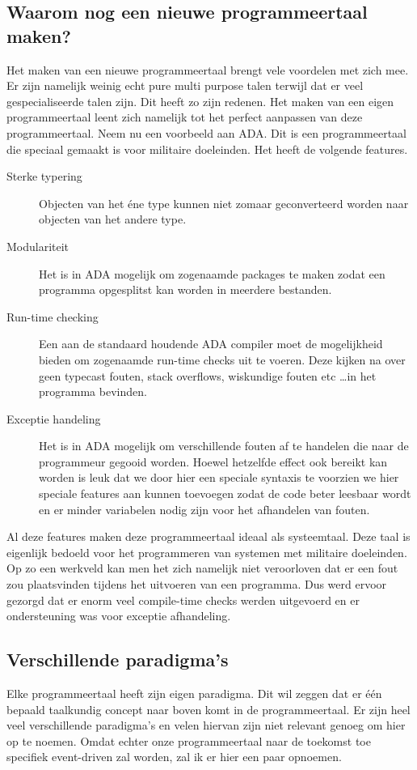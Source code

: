 \documentclass[11pt,a4paper]{article}
\begin{document}
\subsection{Waarom nog een nieuwe programmeertaal maken?}
Het maken van een nieuwe programmeertaal brengt vele voordelen met zich mee. Er zijn namelijk weinig echt pure multi purpose talen terwijl dat er veel gespecialiseerde talen zijn. Dit heeft zo zijn redenen. Het maken van een eigen programmeertaal leent zich namelijk tot het perfect aanpassen van deze programmeertaal. Neem nu een voorbeeld aan ADA. Dit is een programmeertaal die speciaal gemaakt is voor militaire doeleinden. Het heeft de volgende features.

\begin{description}
\item[Sterke typering] Objecten van het éne type kunnen niet zomaar geconverteerd worden naar objecten van het andere type.
\item[Modulariteit] Het is in ADA mogelijk om zogenaamde packages te maken zodat een programma opgesplitst kan worden in meerdere bestanden.
\item[Run-time checking] Een aan de standaard houdende ADA compiler moet de mogelijkheid bieden om zogenaamde run-time checks uit te voeren. Deze kijken na over geen typecast fouten, stack overflows, wiskundige fouten etc \ldots in het programma bevinden.
\item[Exceptie handeling] Het is in ADA mogelijk om verschillende fouten af te handelen die naar de programmeur gegooid worden. Hoewel hetzelfde effect ook bereikt kan worden is leuk dat we door hier een speciale syntaxis te voorzien we hier speciale features aan kunnen toevoegen zodat de code beter leesbaar wordt en er minder variabelen nodig zijn voor het afhandelen van fouten.
\end{description}

Al deze features maken deze programmeertaal ideaal als systeemtaal. Deze taal is eigenlijk bedoeld voor het programmeren van systemen met militaire doeleinden. Op zo een werkveld kan men het zich namelijk niet veroorloven dat er een fout zou plaatsvinden tijdens het uitvoeren van een programma. Dus werd ervoor gezorgd dat er enorm veel compile-time checks werden uitgevoerd en er ondersteuning was voor exceptie afhandeling.

\subsection{Verschillende paradigma's}
Elke programmeertaal heeft zijn eigen paradigma. Dit wil zeggen dat er één bepaald taalkundig concept naar boven komt in de programmeertaal. Er zijn heel veel verschillende paradigma's en velen hiervan zijn niet relevant genoeg om hier op te noemen. Omdat echter onze programmeertaal naar de toekomst toe specifiek event-driven zal worden, zal ik er hier een paar opnoemen.
\end{document}
